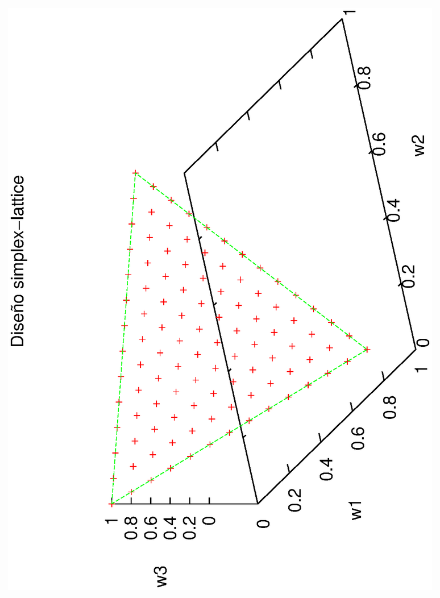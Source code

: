 \begin{figure}[H]
\centering
\scriptsize
\includegraphics[scale=0.27, angle=-90,origin=c]
{Figures_Chapter4/simplex.eps}

\end{figure}

